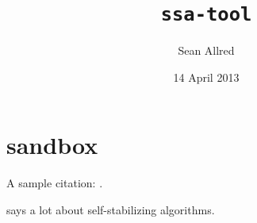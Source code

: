 \documentclass[
minp=25,
maxp=30,
letterpaper,
]{cs-smp}[2013/12/23]
\title
                         {\texttt{ssa-tool}}%
            [A Utility for the Creation and Evaluation \\
                   of Self-Stabilizing Algorithms]
\author
                            {Sean Allred}%
                           [Alan Jamieson]
\date
                            {14 April 2013}
\begin{document}
\maketitle

\begin{abstract}
  
\end{abstract}













\printglossaries

\printbibliography
\appendix
\todos


\section{sandbox}
A sample citation: \autocites[26.1--26.45]{atallah2009algorithms}{Chen1991147}.

\autocite{Dijkstra:1974:SSS:361179.361202} says a lot about self-stabilizing algorithms.
\end{document}
